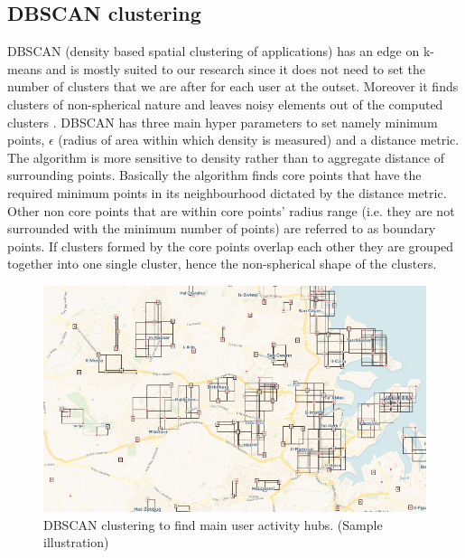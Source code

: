 \documentclass[12pt, a4paper]{report}
\theoremstyle{definition}
\theoremstyle{definition}%
\theoremstyle{definition}%
\theoremstyle{definition}%
\theoremstyle{definition}%
\theoremstyle{definition}%
\begin{document}
\subsection{DBSCAN clustering}  \label{subsection:methodology:dbscan_clustering}
DBSCAN (density based spatial clustering of applications) has an edge on k-means and is mostly suited to our research since it does not need to set the number of clusters that we are after for each user at the outset. Moreover it finds clusters of non-spherical nature and leaves noisy elements out of the computed clusters \cite{ChakrabortyNKNagwaniLopamudraDey2011}. DBSCAN has three main hyper parameters to set namely minimum points,  $\epsilon$ (radius of area within which density is measured)  and a distance metric. The algorithm is more sensitive to density rather than to aggregate distance of surrounding points. Basically the algorithm finds core points that have the required minimum points in its neighbourhood dictated by the distance metric. Other non core points that are within core points' radius range (i.e. they are not surrounded with the minimum number of points) are referred to as boundary points. If clusters formed by the core points overlap each other they are grouped together into one single cluster, hence the non-spherical shape of the clusters.


\begin{figure}[!]	
	\includegraphics[scale=0.60]{clustering.jpg}
	\centering
	\caption[DBSCAN clustering]{DBSCAN clustering to find main user activity hubs. (Sample illustration)}
	\label{fig:db_scan_clustering}
\end{figure}
 
\end{document}
